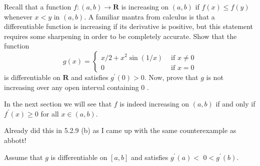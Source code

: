 \begin{exercise}
  Recall that a function $f:(a, b) \rightarrow \mathbf{R}$ is increasing on $(a, b)$ if $f(x) \leq f(y)$ whenever $x<y$ in $(a, b)$. A familiar mantra from calculus is that a differentiable function is increasing if its derivative is positive, but this statement requires some sharpening in order to be completely accurate.
  Show that the function
  $$
  g(x)= \begin{cases}x / 2+x^{2} \sin (1 / x) & \text { if } x \neq 0 \\ 0 & \text { if } x=0\end{cases}
  $$
  is differentiable on $\mathbf{R}$ and satisfies $g^{\prime}(0)>0$. Now, prove that $g$ is not increasing over any open interval containing 0 .

  In the next section we will see that $f$ is indeed increasing on $(a, b)$ if and only if $f^{\prime}(x) \geq 0$ for all $x \in(a, b)$.
\end{exercise}
\begin{solution}
  Already did this in 5.2.9 (b) as I came up with the same counterexample as abbott!
\end{solution}

\begin{exercise}
  Assume that $g$ is differentiable on $[a, b]$ and satisfies $g^{\prime}(a)<$ $0<g^{\prime}(b)$.
\end{exercise}
\begin{solution}
\end{solution}

